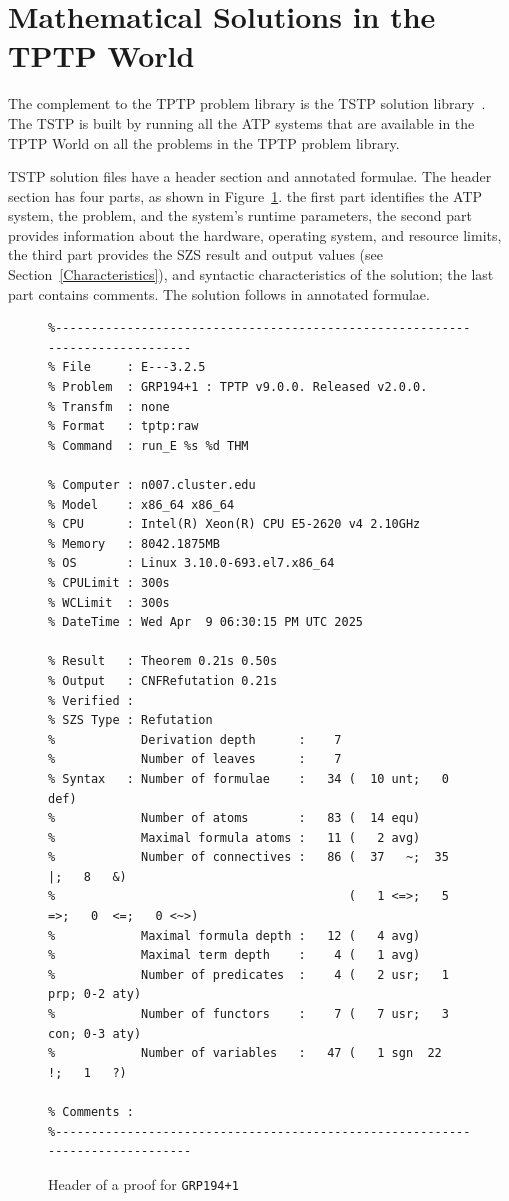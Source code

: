 \documentclass[runningheads]{llncs}
\begin{document}
\section{Mathematical Solutions in the TPTP World}
\label{TSTP}

The complement to the TPTP problem library is the TSTP solution library~\cite{Sut07-CSR,Sut10}.
The TSTP is built by running all the ATP systems that are available in the TPTP World on
all the problems in the TPTP problem library.

TSTP solution files have a header section and annotated formulae.
The header section has four parts, as shown in Figure~\ref{ExampleDerivationHeader}.
the first part identifies the ATP system, the problem, and the system's runtime parameters,
the second part provides information about the hardware, operating system, and resource limits,
the third part provides the SZS result and output values (see Section~\ref{Characteristics}), 
and syntactic characteristics of the solution; the last part contains comments.
The solution follows in annotated formulae.

\begin{figure}[htb]
\centering
{\scriptsize
{\setlength{\baselineskip}{2.5mm}
\begin{verbatim}
%------------------------------------------------------------------------------
% File     : E---3.2.5
% Problem  : GRP194+1 : TPTP v9.0.0. Released v2.0.0.
% Transfm  : none
% Format   : tptp:raw
% Command  : run_E %s %d THM

% Computer : n007.cluster.edu
% Model    : x86_64 x86_64
% CPU      : Intel(R) Xeon(R) CPU E5-2620 v4 2.10GHz
% Memory   : 8042.1875MB
% OS       : Linux 3.10.0-693.el7.x86_64
% CPULimit : 300s
% WCLimit  : 300s
% DateTime : Wed Apr  9 06:30:15 PM UTC 2025

% Result   : Theorem 0.21s 0.50s
% Output   : CNFRefutation 0.21s
% Verified : 
% SZS Type : Refutation
%            Derivation depth      :    7
%            Number of leaves      :    7
% Syntax   : Number of formulae    :   34 (  10 unt;   0 def)
%            Number of atoms       :   83 (  14 equ)
%            Maximal formula atoms :   11 (   2 avg)
%            Number of connectives :   86 (  37   ~;  35   |;   8   &)
%                                         (   1 <=>;   5  =>;   0  <=;   0 <~>)
%            Maximal formula depth :   12 (   4 avg)
%            Maximal term depth    :    4 (   1 avg)
%            Number of predicates  :    4 (   2 usr;   1 prp; 0-2 aty)
%            Number of functors    :    7 (   7 usr;   3 con; 0-3 aty)
%            Number of variables   :   47 (   1 sgn  22   !;   1   ?)

% Comments : 
%------------------------------------------------------------------------------
\end{verbatim}
}}
\caption{Header of a proof for {\tt GRP194+1}}
\label{ExampleDerivationHeader}
\end{figure}
\end{document}
